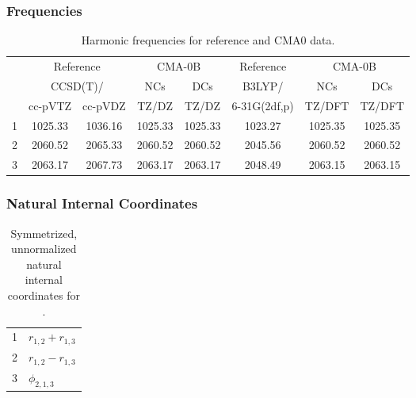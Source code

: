 \documentclass[10pt,oneside]{article}
\begin{document}
\subsubsection*{Frequencies}
\begin{table}[h!]
\centering
\caption{Harmonic frequencies for reference and CMA0 data.}
\begin{tabular}{cccccccc}
\toprule
{} & \multicolumn{2}{c}{Reference} & \multicolumn{2}{c}{CMA-0B} &    Reference & \multicolumn{2}{c}{CMA-0B} \\
{} & \multicolumn{2}{c}{CCSD(T)/} &     NCs &     DCs &       B3LYP/ &     NCs &     DCs \\
{} &   cc-pVTZ & cc-pVDZ &   TZ/DZ &   TZ/DZ & 6-31G(2df,p) &  TZ/DFT &  TZ/DFT \\
\midrule
1 &   1025.33 & 1036.16 & 1025.33 & 1025.33 &      1023.27 & 1025.35 & 1025.35 \\
2 &   2060.52 & 2065.33 & 2060.52 & 2060.52 &      2045.56 & 2060.52 & 2060.52 \\
3 &   2063.17 & 2067.73 & 2063.17 & 2063.17 &      2048.49 & 2063.15 & 2063.15 \\
\bottomrule
\end{tabular}
\end{table}

\clearpage

\subsubsection*{Natural Internal Coordinates}
\begin{table}[h!]
\centering
\caption{Symmetrized, unnormalized natural internal coordinates for .}
\small
\begin{tabular}{ll}
  1   & $r_{1,2} + r_{1,3}$ \\
  2   & $r_{1,2} - r_{1,3}$ \\
  3   & $\phi_{2,1,3}$ \\
\end{tabular}
\end{table}

\clearpage

\subsection{\ \ \ }
\end{document}
